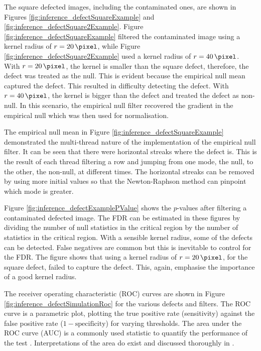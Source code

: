 The square defected images, including the contaminated ones, are shown in Figures \ref{fig:inference_defectSquareExample} and \ref{fig:inference_defectSquare2Example}. Figure \ref{fig:inference_defectSquareExample} filtered the contaminated image using a kernel radius of $r=\SI{20}{\pixel}$, while Figure \ref{fig:inference_defectSquare2Example} used a kernel radius of $r=\SI{40}{\pixel}$. With $r=\SI{20}{\pixel}$, the kernel is smaller than the square defect, therefore, the defect was treated as the null. This is evident because the empirical null mean captured the defect. This resulted in difficulty detecting the defect. With $r=\SI{40}{\pixel}$, the kernel is bigger than the defect and treated the defect as non-null. In this scenario, the empirical null filter recovered the gradient in the empirical null which was then used for normalisation.

The empirical null mean in Figure \ref{fig:inference_defectSquareExample} demonstrated the multi-thread nature of the implementation of the empirical null filter. It can be seen that there were horizontal streaks where the defect is. This is the result of each thread filtering a row and jumping from one mode, the null, to the other, the non-null, at different times. The horizontal streaks can be removed by using more initial values so that the Newton-Raphson method can pinpoint which mode is greater.

Figure \ref{fig:inference_defectExamplePValue} shows the $p$-values after filtering a contaminated defected image. The FDR can be estimated in these figures by dividing the number of null statistics in the critical region by the number of statistics in the critical region. With a sensible kernel radius, some of the defects can be detected. False negatives are common but this is inevitable to control for the FDR. The figure shows that using a kernel radius of $r=\SI{20}{\pixel}$, for the square defect, failed to capture the defect. This, again, emphasise the importance of a good kernel radius. 

The receiver operating characteristic (ROC) curves \citep{green1966signal, metz1978basic, hanley1982meaning, friedman2001elements, cook2007use} are shown in Figure \ref{fig:inference_defectSimulationRoc} for the various defects and filters. The ROC curve is a parametric plot, plotting the true positive rate (sensitivity) against the false positive rate ($1-\text{specificity}$) for varying thresholds. The area under the ROC curve (AUC) is a commonly used statistic to quantify the performance of the test \citep{friedman2001elements}. Interpretations of the area do exist \citep{metz1978basic,hanley1982meaning} and discussed thoroughly in \cite{cook2007use}.

